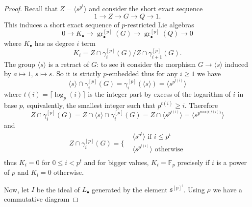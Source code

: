 \documentclass[10pt, oneside]{amsart}
\newcommand{\F}{\mathbb{F}}
\newcommand{\gr}{\operatorname{gr}} %
\newtheorem{proposition}[theorem]{Proposition}
\theoremstyle{definition}
\theoremstyle{remark}
\theoremstyle{plain}
\begin{document}
\begin{proof}
 
 
 


Recall that $Z=\langle s^{p^t}\rangle$ and consider the short exact sequence
$$1\to Z\to G\to Q\to 1.$$
This induces a short exact sequence of $p$-restricted  Lie algebras
$$0\to K_\bullet\to \gr^{[p]}_\bullet(G) \to \gr^{[p]}_\bullet(Q)\to 0$$
where $K_\bullet$ has as degree $i$ term
$$K_i=Z\cap \gamma_i^{[p]}(G)/Z\cap \gamma_{i+1}^{[p]}(G).$$
The group $\langle s\rangle$ is a retract of $G$: to see it consider the morphism $G\to\langle s\rangle$
induced by $a\mapsto 1$, $s\mapsto s$. So it is strictly $p$-embedded thus for any $i\geq 1$ we have 
$$\langle s\rangle\cap\gamma_i^{[p]}(G)=\gamma_i^{[p]}(\langle s\rangle)=\langle s^{p^{t(i)}}\rangle$$
where $t(i)=\lceil \log_p(i)\rceil$ is the integer part by excess of the logarithm of $i$ in base $p$, equivalently, the smallest integer such that $p^{t(i)}\geq i$. 
Therefore
$$Z\cap \gamma_i^{[p]}(G)=Z\cap \langle s\rangle\cap\gamma_i^{[p]}(G)=Z\cap\langle s^{p^{t(i)}}\rangle=\langle s^{p^{\mathrm{max}\{t,t(i)\}}}\rangle$$
and
$$Z\cap \gamma_i^{[p]}(G)=\Bigg\{
\begin{aligned}
&\langle s^{p^t}\rangle\text{ if }i\leq p^t\\
&\langle s^{p^{t(i)}}\rangle\text{ otherwise}\\
\end{aligned}$$
thus $K_i=0$ for $0\leq i<p^t$ and for bigger values, $K_i=\F_p$ precisely if $i$ is a power of $p$ and $K_i=0$ otherwise.

Now, let $I$ be the ideal of $L_\bullet$ generated by the element $\mathfrak{s}^{[p]^t}$. Using $\rho$ we have a commutative diagram


\end{proof}
\end{document}
